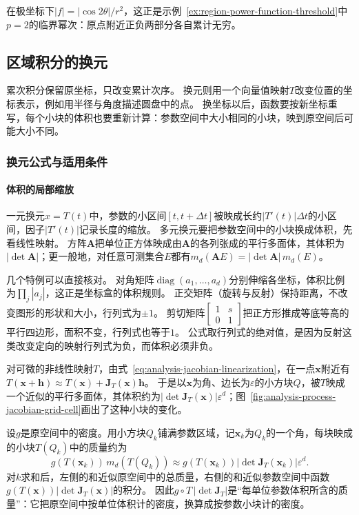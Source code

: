 在极坐标下$|f|=|\cos2\theta|/r^2$，这正是示例~\ref{ex:region-power-function-threshold}中$p=2$的临界幂次：原点附近正负两部分各自累计无穷。

\subsection{区域积分的换元}
\label{sec:multivariable-change-variables}

累次积分保留原坐标，只改变累计次序。
换元则用一个向量值映射$T$改变位置的坐标表示，例如用半径与角度描述圆盘中的点。
换坐标以后，函数要按新坐标重写，每个小块的体积也要重新计算：参数空间中大小相同的小块，映到原空间后可能大小不同。

\subsubsection{换元公式与适用条件}

\paragraph{体积的局部缩放}

一元换元$x=T(t)$中，参数的小区间$[t,t+\Delta t]$被映成长约$|T'(t)|\Delta t$的小区间，因子$|T'(t)|$记录长度的缩放。
多元换元要把参数空间中的小块换成体积，先看线性映射。
方阵$\bm A$把单位正方体映成由$\bm A$的各列张成的平行多面体，其体积为$|\det\bm A|$；更一般地，对任意可测集合$E$都有$m_d(\bm AE)=|\det\bm A|\,m_d(E)$。

几个特例可以直接核对。
对角矩阵$\operatorname{diag}(a_1,\ldots,a_d)$分别伸缩各坐标，体积比例为$\prod_j|a_j|$，这正是坐标盒的体积规则。
正交矩阵（旋转与反射）保持距离，不改变图形的形状和大小，行列式为$\pm1$。
剪切矩阵$\begin{bmatrix}1&s\\0&1\end{bmatrix}$把正方形推成等底等高的平行四边形，面积不变，行列式也等于$1$。
公式取行列式的绝对值，是因为反射这类改变定向的映射行列式为负，而体积必须非负。

对可微的非线性映射$T$，由式~\eqref{eq:analysis-jacobian-linearization}，在一点$\bm x$附近有$T(\bm x+\bm h)\approx T(\bm x)+\bm J_T(\bm x)\bm h$。
于是以$\bm x$为角、边长为$\varepsilon$的小方块$Q$，被$T$映成一个近似的平行多面体，其体积约为$|\det\bm J_T(\bm x)|\varepsilon^d$；图~\ref{fig:analysis-process-jacobian-grid-cell}画出了这种小块的变化。

设$g$是原空间中的密度。用小方块$Q_k$铺满参数区域，记$\bm x_k$为$Q_k$的一个角，每块映成的小块$T(Q_k)$中的质量约为
\[
 g(T(\bm x_k))\,m_d(T(Q_k))\approx g(T(\bm x_k))|\det\bm J_T(\bm x_k)|\varepsilon^d.
\]
对$k$求和后，左侧的和近似原空间中的总质量，右侧的和近似参数空间中函数$g(T(\bm x))|\det\bm J_T(\bm x)|$的积分。
因此$g\circ T\,|\det\bm J_T|$是“每单位参数体积所含的质量”：它把原空间中按单位体积计的密度，换算成按参数小块计的密度。

